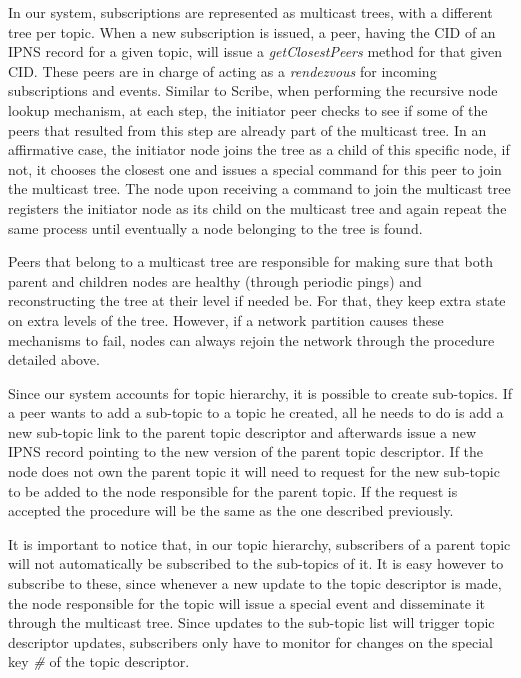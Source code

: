 In our system, subscriptions are represented as multicast trees, with a
different tree per topic. When a new subscription is issued, a peer,
having the CID of an IPNS record for a given topic, will issue a
\emph{getClosestPeers} method for that given CID. These peers are in
charge of acting as a \emph{rendezvous} for incoming subscriptions and
events. Similar to Scribe, when performing the recursive node lookup
mechanism, at each step, the initiator peer checks to see if some of the
peers that resulted from this step are already part of the multicast
tree. In an affirmative case, the initiator node joins the tree as a
child of this specific node, if not, it chooses the closest one and
issues a special command for this peer to join the multicast tree. The
node upon receiving a command to join the multicast tree registers the
initiator node as its child on the multicast tree and again repeat the
same process until eventually a node belonging to the tree is found.

Peers that belong to a multicast tree are responsible for making sure
that both parent and children nodes are healthy (through periodic pings)
and reconstructing the tree at their level if needed be. For that, they
keep extra state on extra levels of the tree. However, if a network
partition causes these mechanisms to fail, nodes can always rejoin the
network through the procedure detailed above.

Since our system accounts for topic hierarchy, it is possible to create
sub-topics. If a peer wants to add a sub-topic to a topic he created,
all he needs to do is add a new sub-topic link to the parent topic
descriptor and afterwards issue a new IPNS record pointing to the new
version of the parent topic descriptor. If the node does not own the
parent topic it will need to request for the new sub-topic to be added
to the node responsible for the parent topic. If the request is accepted
the procedure will be the same as the one described previously.

It is important to notice that, in our topic hierarchy, subscribers of a
parent topic will not automatically be subscribed to the sub-topics of
it. It is easy however to subscribe to these, since whenever a new
update to the topic descriptor is made, the node responsible for the
topic will issue a special event and disseminate it through the
multicast tree. Since updates to the sub-topic list will trigger topic
descriptor updates, subscribers only have to monitor for changes on the
special key \emph{\#} of the topic descriptor.

